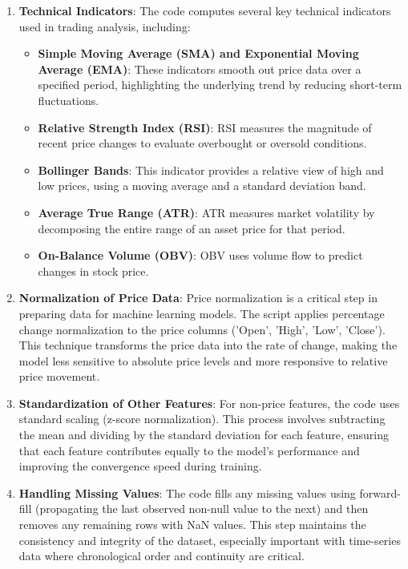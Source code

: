 \documentclass[10pt,twocolumn,letterpaper]{article}
\begin{document}
\begin{enumerate}
   \item \textbf{Technical Indicators}: The code computes several key technical indicators used in trading analysis, including:
         \begin{itemize}
            \item \textbf{Simple Moving Average (SMA) and Exponential Moving Average (EMA)}: These indicators smooth out price data over a specified period, highlighting the underlying trend by reducing short-term fluctuations.
            \item \textbf{Relative Strength Index (RSI)}: RSI measures the magnitude of recent price changes to evaluate overbought or oversold conditions.
            \item \textbf{Bollinger Bands}: This indicator provides a relative view of high and low prices, using a moving average and a standard deviation band.
            \item \textbf{Average True Range (ATR)}: ATR measures market volatility by decomposing the entire range of an asset price for that period.
            \item \textbf{On-Balance Volume (OBV)}: OBV uses volume flow to predict changes in stock price.
         \end{itemize}

   \item \textbf{Normalization of Price Data}: Price normalization is a critical step in preparing data for machine learning models. The script applies percentage change normalization to the price columns ('Open', 'High', 'Low', 'Close'). This technique transforms the price data into the rate of change, making the model less sensitive to absolute price levels and more responsive to relative price movement.

   \item \textbf{Standardization of Other Features}: For non-price features, the code uses standard scaling (z-score normalization). This process involves subtracting the mean and dividing by the standard deviation for each feature, ensuring that each feature contributes equally to the model's performance and improving the convergence speed during training.

   \item \textbf{Handling Missing Values}: The code fills any missing values using forward-fill (propagating the last observed non-null value to the next) and then removes any remaining rows with NaN values. This step maintains the consistency and integrity of the dataset, especially important with time-series data where chronological order and continuity are critical.

\end{enumerate}
\end{document}
